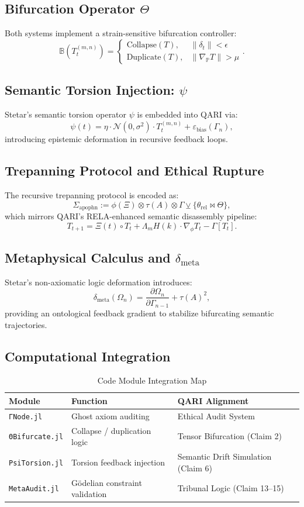 \documentclass[12pt]{article}
\begin{document}
\subsection{Bifurcation Operator $\Theta$}
Both systems implement a strain-sensitive bifurcation controller:
\[
\mathbb{B}(T_t^{(m,n)}) = 
\begin{cases}
\text{Collapse}(T), & \|\delta_t\| < \epsilon \\
\text{Duplicate}(T), & \|\nabla_{\mathbb{P}} T\| > \mu
\end{cases}.
\]

\subsection{Semantic Torsion Injection: $\psi$}
Stetar’s semantic torsion operator $\psi$ is embedded into QARI via:
\[
\psi(t) = \eta \cdot \mathcal{N}(0, \sigma^2) \cdot T_t^{(m,n)} + \varepsilon_{\text{bias}}(\Gamma_n),
\]
introducing epistemic deformation in recursive feedback loops.

\subsection{Trepanning Protocol and Ethical Rupture}
The recursive trepanning protocol is encoded as:
\[
\Sigma_{\text{apophn}} := \phi(\Xi) \otimes \tau(A) \otimes \Gamma \veebar \{\theta_{\text{rel}} \bowtie \Theta\},
\]
which mirrors QARI’s RELA-enhanced semantic disassembly pipeline:
\[
T_{t+1} = \Xi(t) \circ T_t + \Lambda_m H(k) \cdot \nabla_\phi T_t - \Gamma[T_t].
\]

\subsection{Metaphysical Calculus and $\delta_{\text{meta}}$}
Stetar’s non-axiomatic logic deformation introduces:
\[
\delta_{\text{meta}}(\Omega_n) = \frac{\partial \Omega_n}{\partial \Gamma_{n-1}} + \tau(A)^2,
\]
providing an ontological feedback gradient to stabilize bifurcating semantic trajectories.

\subsection{Computational Integration}
\begin{table}[h!]
\centering
\begin{tabular}{|l|l|l|}
\hline
\textbf{Module} & \textbf{Function} & \textbf{QARI Alignment} \\
\hline
\texttt{ΓNode.jl} & Ghost axiom auditing & Ethical Audit System \\
\texttt{ΘBifurcate.jl} & Collapse / duplication logic & Tensor Bifurcation (Claim 2) \\
\texttt{PsiTorsion.jl} & Torsion feedback injection & Semantic Drift Simulation (Claim 6) \\
\texttt{MetaAudit.jl} & Gödelian constraint validation & Tribunal Logic (Claim 13–15) \\
\hline
\end{tabular}
\caption{Code Module Integration Map}
\end{table}
\end{document}
